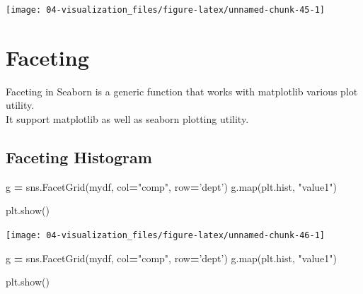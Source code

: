 \documentclass[
]{book}
\newenvironment{Shaded}{\begin{snugshade}}{\end{snugshade}}
\newcommand{\BuiltInTok}[1]{#1}
\newcommand{\NormalTok}[1]{#1}
\newcommand{\OperatorTok}[1]{\textcolor[rgb]{0.43,0.43,0.43}{\textbf{#1}}}
\newcommand{\StringTok}[1]{\textcolor[rgb]{0.5,0.5,0.5}{#1}}
\begin{document}
\texttt{[image: 04-visualization\_files/figure-latex/unnamed-chunk-45-1]}

\hypertarget{faceting}{%
\section{Faceting}\label{faceting}}

Faceting in Seaborn is a generic function that works with matplotlib various plot utility.\\
It support matplotlib as well as seaborn plotting utility.

\hypertarget{faceting-histogram}{%
\subsection{Faceting Histogram}\label{faceting-histogram}}

\begin{Shaded}
\begin{Highlighting}[]
\NormalTok{g }\OperatorTok{=}\NormalTok{ sns.FacetGrid(mydf, col}\OperatorTok{=}\StringTok{"comp"}\NormalTok{, row}\OperatorTok{=}\StringTok{'dept'}\NormalTok{)}
\NormalTok{g.}\BuiltInTok{map}\NormalTok{(plt.hist, }\StringTok{"value1"}\NormalTok{)}
\end{Highlighting}
\end{Shaded}

\begin{Shaded}
\begin{Highlighting}[]
\NormalTok{plt.show()}
\end{Highlighting}
\end{Shaded}

\texttt{[image: 04-visualization\_files/figure-latex/unnamed-chunk-46-1]}

\begin{Shaded}
\begin{Highlighting}[]
\NormalTok{g }\OperatorTok{=}\NormalTok{ sns.FacetGrid(mydf, col}\OperatorTok{=}\StringTok{"comp"}\NormalTok{, row}\OperatorTok{=}\StringTok{'dept'}\NormalTok{)}
\NormalTok{g.}\BuiltInTok{map}\NormalTok{(plt.hist, }\StringTok{"value1"}\NormalTok{)}
\end{Highlighting}
\end{Shaded}

\begin{Shaded}
\begin{Highlighting}[]
\NormalTok{plt.show()}
\end{Highlighting}
\end{Shaded}
\end{document}
